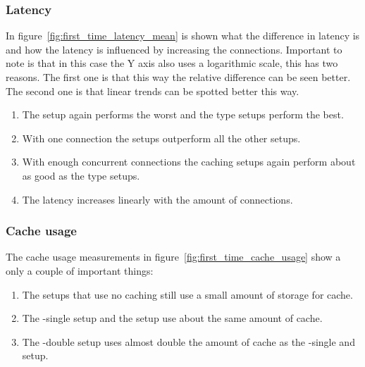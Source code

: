 \documentclass[twoside,openright]{uva-bachelor-thesis}
\begin{document}


\FloatBarrier


\subsubsection{Latency}
In figure~\ref{fig:first_time_latency_mean} is shown what the difference in
latency is and how the latency is influenced by increasing the connections.
Important to note is that in this case the Y axis also uses a logarithmic scale,
this has two reasons. The first one is that this way the relative difference can
be seen better. The second one is that linear trends can be spotted better this
way.
\begin{enumerate}
    \item
        The \ipp setup again performs the worst and the \cdn type setups perform
        the best.

    \item
        With one connection the \cdn setups outperform all the other setups.

    \item
        With enough concurrent connections the caching \lt setups again perform
        about as good as the \cdn type setups.

    \item
        The latency increases linearly with the amount of connections.



\end{enumerate}



\subsubsection{Cache usage}
The cache usage measurements in figure~\ref{fig:first_time_cache_usage} show a
only a couple of important things:
\begin{enumerate}
    \item
        The setups that use no caching still use a small amount of storage for
        cache.

    \item
        The \lt-single setup and the \cdn setup use about the same amount of
        cache.

    \item
        The \lt-double setup uses almost double the amount of cache as the
        \lt-single and \cdn setup.
\end{enumerate}
\end{document}
